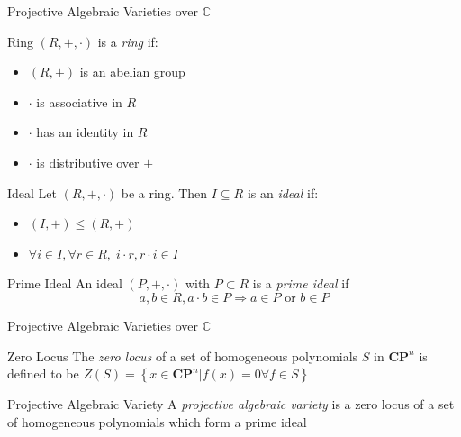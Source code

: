 \documentclass[handout]{beamer}
\newcommand{\Complex}{\mathbb{C}}
\newcommand{\CP}{\mathbf{CP}}
\begin{document}
  \begin{frame}{Projective Algebraic Varieties over $\Complex$}
      \linespread{0.7}
      \pause
      \begin{block}{Ring}
          $(R, +, \cdot)$ is a \textit{ring} if:
      \begin{multicols}{2}
          \begin{itemize}
              \item $(R, +)$ is an abelian group
              \item $\cdot$ is associative in $R$
              \item $\cdot$ has an identity in $R$
              \item $\cdot$ is distributive over $+$
          \end{itemize}
      \end{multicols}
      \end{block}
      \pause
      \begin{block}{Ideal}
          Let $(R, +, \cdot)$ be a ring. Then $I \subseteq R$ is an \textit{ideal} if:
          \begin{multicols}{2}
              \begin{itemize}
                  \item $(I, +) \le (R, +)$
                  \item $\forall i \in I, \forall r \in R, \; i \cdot r, r
                      \cdot i \in I$
              \end{itemize}
          \end{multicols}
      \end{block}
      \pause
      \begin{block}{Prime Ideal}
          An ideal $(P, +, \cdot)$ with $P \subset R$ is a \textit{prime
          ideal} if
          $$a, b \in R, a\cdot b \in P \Rightarrow a \in P \textrm{ or
          } b \in P$$
      \end{block}
  \end{frame}
  \begin{frame}{Projective Algebraic Varieties over $\Complex$}
      \pause
      \begin{block}{Zero Locus}
          The \textit{zero locus} of a set of homogeneous polynomials $S$ in
          $\CP^n$ is defined to be $Z(S) = \left\{ x \in \CP^n | f(x) = 0
          \forall f \in S \right\}$
      \end{block}
      \pause
      \begin{block}{Projective Algebraic Variety}
          A \textit{projective algebraic variety} is a zero locus of a set of
          homogeneous polynomials which form a prime ideal
      \end{block}
  \end{frame}
\end{document}
